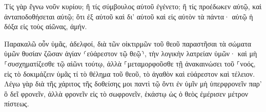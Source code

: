\documentclass{openreader}
\begin{document}
Τίς γὰρ ἔγνω νοῦν κυρίου; ἢ τίς σύμβουλος αὐτοῦ ἐγένετο; 
ἢ τίς προέδωκεν αὐτῷ, καὶ ἀνταποδοθήσεται αὐτῷ; 
ὅτι ἐξ αὐτοῦ καὶ δι’ αὐτοῦ καὶ εἰς αὐτὸν τὰ πάντα· αὐτῷ ἡ δόξα εἰς τοὺς αἰῶνας, ἀμήν. 

Παρακαλῶ οὖν ὑμᾶς, ἀδελφοί, διὰ τῶν οἰκτιρμῶν τοῦ θεοῦ παραστῆσαι τὰ σώματα ὑμῶν θυσίαν ζῶσαν ἁγίαν ⸂εὐάρεστον τῷ θεῷ⸃, τὴν λογικὴν λατρείαν ὑμῶν· 
καὶ μὴ ⸀συσχηματίζεσθε τῷ αἰῶνι τούτῳ, ἀλλὰ ⸀μεταμορφοῦσθε τῇ ἀνακαινώσει τοῦ ⸀νοός, εἰς τὸ δοκιμάζειν ὑμᾶς τί τὸ θέλημα τοῦ θεοῦ, τὸ ἀγαθὸν καὶ εὐάρεστον καὶ τέλειον. 
Λέγω γὰρ διὰ τῆς χάριτος τῆς δοθείσης μοι παντὶ τῷ ὄντι ἐν ὑμῖν μὴ ὑπερφρονεῖν παρ’ ὃ δεῖ φρονεῖν, ἀλλὰ φρονεῖν εἰς τὸ σωφρονεῖν, ἑκάστῳ ὡς ὁ θεὸς ἐμέρισεν μέτρον πίστεως. 
\end{document}
